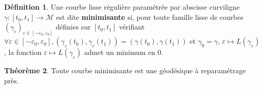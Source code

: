 \documentclass[12pt,a4paper]{article}
\theoremstyle{definition}
\newtheorem{thm}{Théorème}
\newtheorem{defn}[thm]{Définition}
\begin{document}
\begin{defn}
Une courbe lisse régulière paramétrée par abscisse curviligne $\gamma:[t_0,t_1]\to\mathcal{M}$ est dite \textbf{minimisante} si, pour toute famille lisse de courbes $(\gamma_{\varepsilon})_{\varepsilon\in[-\varepsilon_0,\varepsilon_0]}$ définies sur $[t_0,t_1]$ vérifiant \newline$\forall \varepsilon\in[-\varepsilon_0,\varepsilon_0],(\gamma_\varepsilon(t_0),\gamma_\varepsilon(t_1))=(\gamma(t_0),\gamma(t_1))$ et $\gamma_0=\gamma$, $\varepsilon\mapsto L(\gamma_\varepsilon)$, la fonction $\varepsilon\mapsto L(\gamma_\varepsilon)$ admet un minimum en $0$.
\end{defn}
\newpage
\begin{thm}
Toute courbe minimisante est une géodésique à reparamétrage près.
\end{thm}
\end{document}
